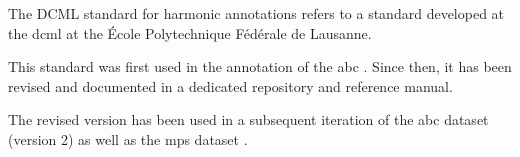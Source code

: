 

The DCML standard for harmonic annotations refers to a
standard developed at the \gls{dcml} at the \'Ecole
Polytechnique F\'ed\'erale de Lausanne.

This standard was first used in the annotation of the
\gls{abc}
\parencite{neuwirth2018annotated}. Since then, it has been
revised and documented in a dedicated
repository
and reference
manual.

The revised version has been used in a subsequent iteration
of the \gls{abc} dataset (version 2) as well as the
\gls{mps} dataset \parencite{hentschel2021annotated}.
